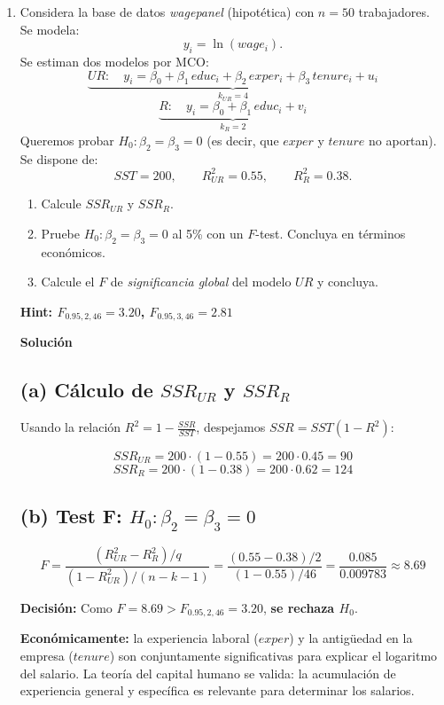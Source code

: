 \documentclass[10pt,a4paper]{article}
\begin{document}
\begin{enumerate}
\begin{conclusion}
Las variables \(x_3\) y \(x_4\) son conjuntamente relevantes para explicar \(y\); aportan capacidad explicativa al modelo.
\end{conclusion}


\item Considera la base de datos \emph{wagepanel} (hipotética) con $n=50$ trabajadores. Se modela:
\[
y_i=\ln(wage_i).
\]
Se estiman dos modelos por MCO:
\[
\underbrace{UR:\quad y_i=\beta_0+\beta_1\,educ_i+\beta_2\,exper_i+\beta_3\,tenure_i+u_i}_{k_{UR}=4}
\]
\[
\underbrace{R:\quad y_i=\beta_0+\beta_1\,educ_i+v_i}_{k_{R}=2}
\]
Queremos probar $H_0:\beta_2=\beta_3=0$ (es decir, que $exper$ y $tenure$ no aportan). Se dispone de:
\[
SST=200,\qquad R^2_{UR}=0.55,\qquad R^2_{R}=0.38.
\]
\begin{enumerate}
  \item Calcule $SSR_{UR}$ y $SSR_R$.
  \item Pruebe $H_0:\beta_2=\beta_3=0$ al 5\% con un $F$-test. Concluya en términos económicos.
  \item Calcule el $F$ de \emph{significancia global} del modelo $UR$ y concluya.
\end{enumerate}
\textbf{Hint: $F_{0.95,2,46}=3.20$, $F_{0.95,3,46}=2.81$}

\textbf{Solución}



\subsection*{(a) Cálculo de \(SSR_{UR}\) y \(SSR_R\)}

Usando la relación \(R^2 = 1 - \frac{SSR}{SST}\), despejamos \(SSR = SST(1-R^2)\):

\[
SSR_{UR} = 200 \cdot (1 - 0.55) = 200 \cdot 0.45 = 90
\]
\[
SSR_R = 200 \cdot (1 - 0.38) = 200 \cdot 0.62 = 124
\]

\subsection*{(b) Test F: \(H_0: \beta_2 = \beta_3 = 0\)}

\[
F = \frac{(R^2_{UR}-R^2_R)/q}{(1-R^2_{UR})/(n-k-1)} = \frac{(0.55-0.38)/2}{(1-0.55)/46} = \frac{0.085}{0.009783} \approx 8.69
\]

\textbf{Decisión:} Como \(F = 8.69 > F_{0.95,2,46} = 3.20\), \textbf{se rechaza \(H_0\)}.

\begin{conclusion}
\textbf{Económicamente:} la experiencia laboral (\(exper\)) y la antigüedad en la empresa (\(tenure\)) son conjuntamente significativas para explicar el logaritmo del salario. La teoría del capital humano se valida: la acumulación de experiencia general y específica es relevante para determinar los salarios.
\end{conclusion}


\end{enumerate}
\end{document}
